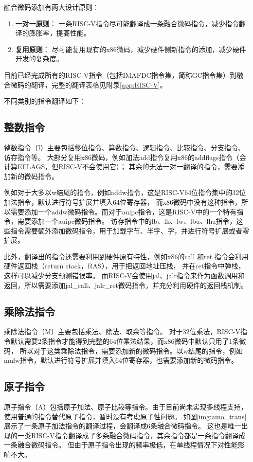 融合微码添加有两大设计原则：
\begin{enumerate}
  \item \textbf{一对一原则}： 一条RISC-V指令尽可能翻译成一条融合微码指令，减少指令翻译的膨胀率，提高性能。
  \item \textbf{复用原则}： 尽可能复用现有的x86微码，减少硬件侧新指令的添加，减少硬件开发的复杂度。
\end{enumerate}

目前已经完成所有的RISC-V指令（包括IMAFDC指令集，简称GC指令集）到融合微码的翻译，完整的翻译表格见附录\ref{app:RISC-V}。

不同类别的指令翻译如下：

\subsection{整数指令}
整数指令（I）主要包括移位指令、算数指令、逻辑指令、比较指令、分支指令、访存指令等。
大部分复用x86微码，例如加法add指令复用x86的addflags指令（会计算EFLAGS，但RISC-V不会使用它）；
其余的无法一对一翻译的指令，需要添加新的微码指令。

例如对于大多以w结尾的指令，例如addw指令，这是RISC-V64位指令集中的32位加法指令，默认进行符号扩展并填入64位寄存器，
而x86微码中没有这种指令，所以需要添加一个addw微码指令。而对于auipc指令，这是RISC-V中的一个特有指令，需要添加一个auipc微码指令。
访存指令中的lb、lh、lw、lbu、lhu指令，这些指令需要额外添加微码指令，用于加载字节、半字、字，并进行符号扩展或者零扩展。

此外，翻译出的指令还需要利用到硬件原有特性，例如x86的call 和ret 指令会利用硬件返回栈（return stack，RAS），用于把返回地址压栈，
并在ret指令中弹栈，这样可以减少分支预测错误率。
而RISC-V会使用jal、jalr指令来作为函数调用和返回，所以需要添加jal\_call、jalr\_ret微码指令，并充分利用硬件的返回栈机制。


\subsection{乘除法指令}
乘除法指令（M）主要包括乘法、除法、取余等指令。
对于32位乘法，RISC-V指令默认需要2条指令才能得到完整的64位乘法结果，而x86微码中默认只用了1条微码，
所以对于这类乘除法指令，需要添加新的微码指令。以w结尾的指令，例如mulw指令，默认进行符号扩展并填入64位寄存器，也需要添加新的微码指令。

\subsection{原子指令}
原子指令（A）包括原子加法、原子比较等指令。由于目前尚未实现多线程支持，使用普通的指令替代原子指令，暂时没有考虑原子性问题。
如图\ref{img:amo_trans}展示了一条原子加法指令的翻译过程，会翻译成6条融合微码指令。
这也是唯一出现的一类RISC-V指令翻译成了多条融合微码指令，其余指令都是一条指令翻译成一条融合微码指令。
但由于原子指令出现的频率极低，在单线程情况下对性能影响不大。

